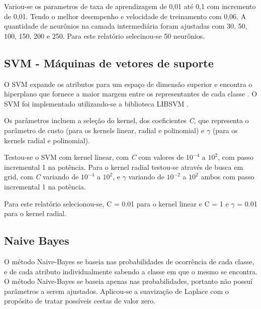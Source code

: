 Variou-se os parametros de taxa de aprendizagem de 0,01 até 0,1 com incremento de 0,01. Tendo o melhor desempenho e velocidade de treinamento com 0,06. A quantidade de neurônios na camada intermediária foram ajustadas com 30, 50, 100, 150, 200 e 250. Para este relatório selecinou-se 50 neurônios.

\subsection{SVM - Máquinas de vetores de suporte}

O SVM expande os atributos para um espaço de dimensão superior e encontra o hiperplano que fornece a maior margem entre os representantes de cada classe \cite{praticalSVM}. O SVM foi implementado utilizando-se a biblioteca LIBSVM \cite{libsvm}.

Os parâmetros incluem a seleção do kernel, dos coeficientes \emph{C}, que representa o parâmetro de custo (para os kernels linear, radial e polinomial) e \(\gamma\) (para os kernels radial e polinomial).

Testou-se o SVM com kernel linear, com \emph{C} com valores de \(10^{-4}\) a \(10^2\), com passo incremental 1 na potência. Para o kernel radial testou-se através de busca em grid, com \emph{C} variando de \(10^{-4}\) a \(10^2\), e \(\gamma\) variando de \(10^{-2}\) a \(10^2\) ambos com passo incremental 1 na potência.

Para este relatório selecionou-se, C = 0.01 para o kernel linear e C = 1 e \(\gamma\) = 0.01 para o kernel radial.

\subsection{Naive Bayes}

O método Naive-Bayes se baseia nas probabilidades de ocorrência de cada classe, e de cada atributo individualmente sabendo a classe em que o mesmo se encontra. O método Naive-Bayes se baseia apenas nas probabilidades, portanto não possuí parâmetros a serem ajustados. Aplicou-se a suavização de Laplace com o propósito de tratar possíveis cestas de valor zero.

